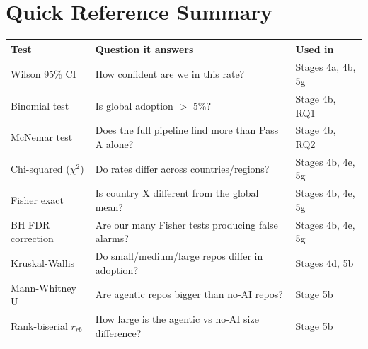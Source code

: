 \documentclass[11pt,a4paper]{article}
\begin{document}
\section*{Quick Reference Summary}

\vspace{4pt}
\begin{tabular}{L{3.8cm}L{4cm}L{6.5cm}}
\toprule
\textbf{Test} & \textbf{Question it answers} & \textbf{Used in} \\
\midrule
{}
Wilson 95\% CI & How confident are we in this rate? & Stages 4a, 4b, 5g \\
Binomial test & Is global adoption $>$ 5\%? & Stage 4b, RQ1 \\
McNemar test & Does the full pipeline find more than Pass A alone? & Stage 4b, RQ2 \\
Chi-squared ($\chi^2$) & Do rates differ across countries/regions? & Stages 4b, 4e, 5g \\
Fisher exact & Is country X different from the global mean? & Stages 4b, 4e, 5g \\
BH FDR correction & Are our many Fisher tests producing false alarms? & Stages 4b, 4e, 5g \\
Kruskal-Wallis & Do small/medium/large repos differ in adoption? & Stages 4d, 5b \\
Mann-Whitney U & Are agentic repos bigger than no-AI repos? & Stage 5b \\
Rank-biserial $r_{rb}$ & How large is the agentic vs no-AI size difference? & Stage 5b \\
\bottomrule
\end{tabular}
\end{document}
